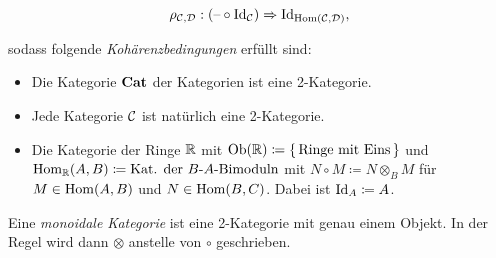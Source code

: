 \documentclass{cheat-sheet}
\newenvironment{centertikzcd}
  {\begin{center}\begin{tikzcd}}
  {\end{tikzcd}\end{center}}
\begin{document}
\begin{defn}
\begin{itemize}
\[      \rho_{\mathcal{C}, \mathcal{D}} : (\text{--} \circ \operatorname{Id}_{\mathcal{C}}) \Rightarrow \operatorname{Id}_{\operatorname{Hom}(\mathcal{C}, \mathcal{D})},
    \]
  \end{itemize}
  sodass folgende \emph{Kohärenzbedingungen} erfüllt sind:
\end{defn}


\begin{bspe}
  \begin{itemize}
    \item Die Kategorie $\mathbf{Cat}$ der Kategorien ist eine 2-Kategorie.
    \item Jede Kategorie $\mathcal{C}$ ist natürlich eine 2-Kategorie.
    \item Die Kategorie der Ringe $\mathbb{R}$ mit $\operatorname{Ob}(\mathbb{R}) \coloneqq \{ \, \text{Ringe mit Eins} \, \}$ und $\operatorname{Hom}_{\mathbb{R}}(A, B) \coloneqq \text{Kat. der $B$-$A$-Bimoduln}$ mit $N \circ M \coloneqq N \otimes_B M$ für $M \in \operatorname{Hom}(A, B)$ und $N \in \operatorname{Hom}(B, C)$. Dabei ist $\operatorname{Id}_A \coloneqq A$. %
  \end{itemize}
\end{bspe}

\begin{defn}
  Eine \emph{monoidale Kategorie} ist eine 2-Kategorie mit genau einem Objekt.
  In der Regel wird dann $\otimes$ anstelle von $\circ$ geschrieben.
\end{defn}
\end{document}
